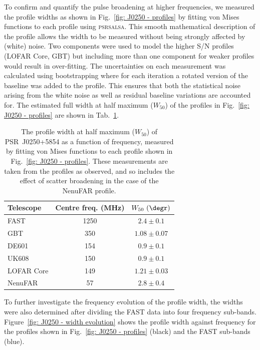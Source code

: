 To confirm and quantify the pulse broadening at higher frequencies, we measured the profile widths as shown in Fig.~\ref{fig: J0250 - profiles} by fitting von Mises functions to each profile using \textsc{psrsalsa}. This smooth mathematical description of the profile allows the width to be measured without being strongly affected by (white) noise. Two components were used to model the higher S/N profiles (LOFAR Core, GBT) but including more than one component for weaker profiles would result in over-fitting. The uncertainties on each measurement was calculated using bootstrapping where for each iteration a rotated version of the baseline was added to the profile. This ensures that both the statistical noise arising from the white noise as well as residual baseline variations are accounted for. The estimated full width at half maximum ($W_{50}$) of the profiles in Fig.~\ref{fig: J0250 - profiles} are shown in Tab.~\ref{tab: J0250 - W50}.
\begin{table}
    \centering
    \caption[Multi-frequency profile widths]{The profile width at half maximum ($W_{50}$) of PSR~J0250+5854 as a function of frequency, measured by fitting von Mises functions to each profile shown in Fig.~\ref{fig: J0250 - profiles}. These measurements are taken from the profiles as observed, and so includes the effect of scatter broadening in the case of the NenuFAR profile.}
    \label{tab: J0250 - W50}
    \begin{tabular}{lcc}
        \hline
        Telescope & Centre freq. (MHz) & $W_{50}~(\degr)$ \\
        \hline
        FAST & 1250 & $2.4\pm0.1$ \\
        GBT & 350 & $1.08\pm0.07$ \\
        DE601 & 154 & $0.9\pm0.1$ \\
        UK608 & 150 & $0.9\pm0.1$ \\
        LOFAR Core & 149 & $1.21\pm0.03$ \\
        NenuFAR & 57 & $2.8\pm0.4$ \\ 
    \end{tabular}
\end{table}
To further investigate the frequency evolution of the profile width, the widths were also determined after dividing the FAST data into four frequency sub-bands. Figure~\ref{fig: J0250 - width evolution} shows the profile width against frequency for the profiles shown in Fig.~\ref{fig: J0250 - profiles} (black) and the FAST sub-bands (blue).

